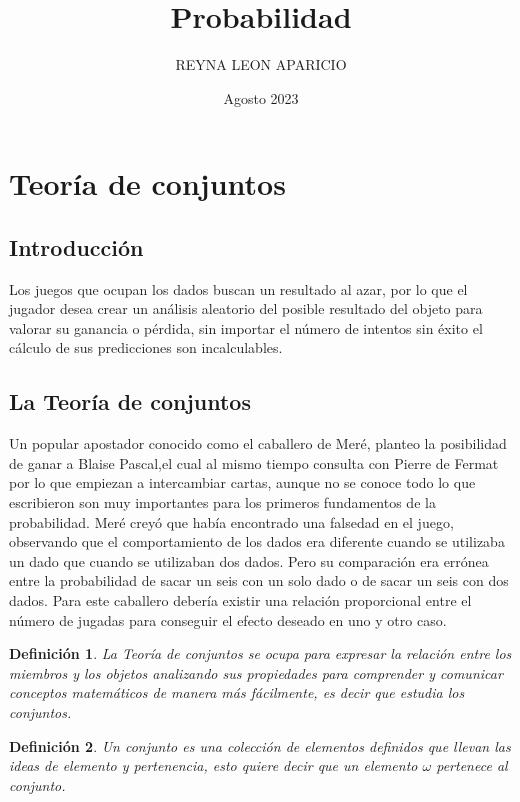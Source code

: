 \documentclass[12pt]{article}
\title{Probabilidad}
\author{REYNA LEON  APARICIO}
\date{Agosto 2023}
\newtheorem{Def}{\quad Definición}
\begin{document}
\maketitle

\section{Teoría de conjuntos}

\subsection{Introducción}

Los juegos que ocupan los dados buscan un resultado al azar, por lo que el jugador desea crear un análisis aleatorio del posible resultado  del objeto para valorar su ganancia o pérdida, sin importar el número de intentos sin éxito el cálculo de sus predicciones son incalculables.



\subsection{La Teoría de conjuntos}

 Un popular apostador conocido como el caballero de Meré, planteo la posibilidad de ganar a Blaise Pascal,el cual al mismo tiempo consulta con Pierre de Fermat por lo que empiezan a intercambiar cartas, aunque no se conoce todo lo que escribieron son muy importantes para los primeros fundamentos de la probabilidad. Meré creyó que había encontrado una falsedad en el juego, observando que el comportamiento de los dados era diferente cuando se utilizaba un dado que cuando se utilizaban dos dados. Pero su comparación era errónea entre la probabilidad de sacar un seis con un solo dado o de sacar un seis con dos dados. Para este caballero debería existir una relación proporcional entre el número de jugadas para conseguir el efecto deseado en uno y otro caso. 
 
\begin{Def}
La Teoría de conjuntos se ocupa para expresar la relación entre los miembros y los objetos analizando sus propiedades para comprender y comunicar conceptos matemáticos de manera más fácilmente, es decir que estudia los conjuntos.
\end{Def}

\begin{Def}
Un conjunto es una colección de elementos definidos que llevan las ideas de elemento y pertenencia, esto quiere decir que un elemento $ \omega $ pertenece al conjunto. 
\end{Def}
\end{document}
